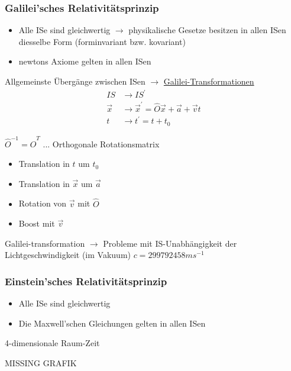 \documentclass[a4paper, 11pt]{article}
\numberwithin{equation}{section}
\begin{document}
\subsubsection*{Galilei'sches Relativitätsprinzip}
\renewcommand{\labelitemi}{-}
\begin{itemize}
\item Alle ISe sind gleichwertig $\rightarrow$ physikalische Gesetze besitzen in allen ISen diesselbe Form (forminvariant bzw. kovariant)
\item newtons Axiome gelten in allen ISen
\end{itemize}
Allgemeinste Übergänge zwischen ISen $\rightarrow$ \underline{Galilei-Transformationen}
\begin{equation}
\begin{aligned}
IS &\rightarrow IS^\prime \\
\vec{x} &\rightarrow \vec{x}^\prime = \hat{O} \vec{x} + \vec{a} + \vec{v}t \\
t &\rightarrow t^\prime = t + t_0
\end{aligned}
\end{equation}


$\hat{O}^{-1} =  \hat{O}^T$ ... Orthogonale Rotationsmatrix

\renewcommand{\labelitemi}{$\bullet$}
\begin{itemize}
\item Translation in $t$ um $t_0$
\item Translation in $\vec{x}$ um $\vec{a}$
\item Rotation von $\vec{v}$ mit $\hat{O}$
\item Boost mit $\vec{v}$
\end{itemize}

Galilei-transformation $\rightarrow$ Probleme mit IS-Unabhängigkeit der \\ Lichtgeschwindigkeit (im Vakuum)
$c = 299792458 m s^{-1}$

\subsubsection*{Einstein'sches Relativitätsprinzip}
\renewcommand{\labelitemi}{-}
\begin{itemize}
\item Alle ISe sind gleichwertig
\item Die Maxwell'schen Gleichungen gelten in allen ISen
\end{itemize}
4-dimensionale Raum-Zeit

MISSING GRAFIK
\end{document}
